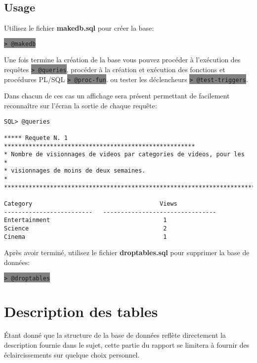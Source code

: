 \documentclass[twoside,openright,a4paper,11pt,french]{article}
\begin{document}
\subsection{Usage}
Utilisez le fichier {\bf makedb.sql} pour créer la base:
\begin{center}
\colorbox{gray}{\lstinline[basicstyle=\ttfamily\color{black}]|> @makedb|}
\end{center}
Une fois termine la création de la base vous pouvez procéder à l'exécution des requêtes
\colorbox{gray}{\lstinline[basicstyle=\ttfamily\color{black}]|> @queries|},
procéder à la création et exécution des fonctions et procédures PL/SQL
\colorbox{gray}{\lstinline[basicstyle=\ttfamily\color{black}]|> @proc-fun|}.
ou tester les déclencheurs
\colorbox{gray}{\lstinline[basicstyle=\ttfamily\color{black}]|> @test-triggers|}.

\smallbreak
Dans chacun de ces cas un affichage sera présent permettant de facilement
reconnaître  sur l'écran la sortie de chaque requête:
\vspace{1cm}

\begin{lstlisting}
SQL> @queries

***** Requete N. 1 ******************************************************
* Nombre de visionnages de videos par categories de videos, pour les            *
* visionnages de moins de deux semaines.                                        *
*************************************************************************

Category                                    Views
-------------------------   --------------------------------
Entertainment                                1
Science                                      2
Cinema                                       1
\end{lstlisting}

\vspace{1cm}
Après avoir terminé, utilisez le fichier {\bf droptables.sql} pour supprimer la base de données:
\begin{center}
\colorbox{gray}{\lstinline[basicstyle=\ttfamily\color{black}]|> @droptables|}
\end{center}

\newpage 
\section{Description des tables}
Étant donné que la structure de la base de données reflète directement la
description fournie dans le sujet, cette partie du rapport se limitera à
fournir des éclaircissements sur quelque choix personnel.
\end{document}
